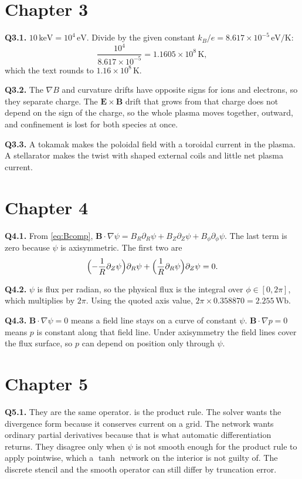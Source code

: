 \documentclass[11pt,a4paper,oneside,openany]{book}
\numberwithin{equation}{chapter}
\newcommand{\grad}{\nabla}
\theoremstyle{definition}
\begin{document}
\section*{Chapter 3}

\textbf{Q3.1.} \(10\,\mathrm{keV}=10^{4}\,\mathrm{eV}\). Divide by the given constant \(k_{B}/e=8.617\times 10^{-5}\,\mathrm{eV/K}\):
\[
\frac{10^{4}}{8.617\times 10^{-5}}=1.1605\times 10^{8}\,\mathrm{K},
\]
which the text rounds to \(1.16\times 10^{8}\,\mathrm{K}\).

\textbf{Q3.2.} The \(\grad B\) and curvature drifts have opposite signs for ions and electrons, so they separate charge. The \(\mathbf{E}\times\mathbf{B}\) drift that grows from that charge does not depend on the sign of the charge, so the whole plasma moves together, outward, and confinement is lost for both species at once.

\textbf{Q3.3.} A tokamak makes the poloidal field with a toroidal current in the plasma. A stellarator makes the twist with shaped external coils and little net plasma current.

\section*{Chapter 4}

\textbf{Q4.1.} From \eqref{eq:Bcomp}, \(\mathbf{B}\cdot\grad\psi=B_{R}\partial_{R}\psi+B_{Z}\partial_{Z}\psi+B_{\phi}\partial_{\phi}\psi\). The last term is zero because \(\psi\) is axisymmetric. The first two are
\[
\Bigl(-\frac{1}{R}\partial_{Z}\psi\Bigr)\partial_{R}\psi
+\Bigl(\frac{1}{R}\partial_{R}\psi\Bigr)\partial_{Z}\psi=0.
\]

\textbf{Q4.2.} \(\psi\) is flux per radian, so the physical flux is the integral over \(\phi\in[0,2\pi]\), which multiplies by \(2\pi\). Using the quoted axis value, \(2\pi\times 0.358870=2.255\,\mathrm{Wb}\).

\textbf{Q4.3.} \(\mathbf{B}\cdot\grad\psi=0\) means a field line stays on a curve of constant \(\psi\). \(\mathbf{B}\cdot\grad p=0\) means \(p\) is constant along that field line. Under axisymmetry the field lines cover the flux surface, so \(p\) can depend on position only through \(\psi\).

\section*{Chapter 5}

\textbf{Q5.1.} They are the same operator.  is the product rule. The solver wants the divergence form because it conserves current on a grid. The network wants ordinary partial derivatives because that is what automatic differentiation returns. They disagree only when \(\psi\) is not smooth enough for the product rule to apply pointwise, which a \(\tanh\) network on the interior is not guilty of. The discrete stencil and the smooth operator can still differ by truncation error.
\end{document}
